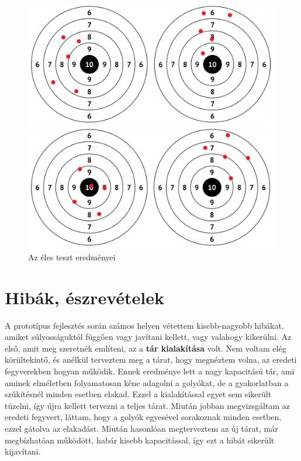 \documentclass[12pt,a4paper]{article}
\begin{document}
\begin{figure}[h!]
	\centering
	\includegraphics[width=1\linewidth]{teszt_eredmenyek}
	\caption{Az éles teszt eredményei}
	\label{fig:teszt_eredmenyek}
\end{figure}

\pagebreak

\section{Hibák, észrevételek}
A prototípus fejlesztés során számos helyen vétettem kisebb-nagyobb hibákat, amiket súlyosságuktól függően vagy javítani kellett, vagy valahogy kikerülni. Az első, amit meg szeretnék említeni, az a \textbf{tár kialakítása} volt. Nem voltam elég körültekintő, és anélkül terveztem meg a tárat, hogy megnéztem volna, az eredeti fegyverekben hogyan működik. Ennek eredménye lett a nagy kapacitású tár, ami aminek elméletben folyamatosan kéne adagolni a golyókat, de a gyakorlatban a szűkítésnél minden esetben elakad. Ezzel a kialakítással egyet sem sikerült tüzelni, így újra kellett tervezni a teljes tárat. Miután jobban megvizsgáltam az eredeti fegyvert, láttam, hogy a golyók egyesével sorakoznak minden esetben, ezzel gátolva az elakadást. Miután hasonlóan megterveztem az új tárat, már megbízhatóan működött, habár kisebb kapacitással, így ezt a hibát sikerült kijavítani.\\
\end{document}
